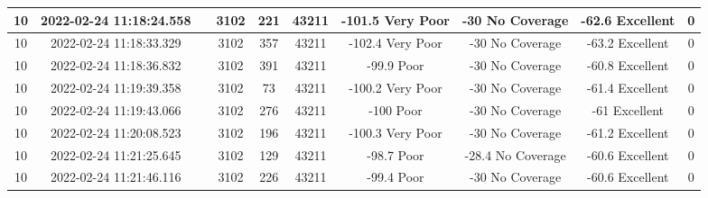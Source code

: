 \begin{longtable*}{|c|c|c|c|c|c|c|c|c|c|}
10&2022-02-24 11:18:24.558&&3102&221&43211& -101.5    Very Poor   & -30       No Coverage & -62.6     Excellent   & 0\\\hline
{}10&2022-02-24 11:18:33.329&&3102&357&43211& -102.4    Very Poor   & -30       No Coverage & -63.2     Excellent   & 0\\\hline
{}10&2022-02-24 11:18:36.832&&3102&391&43211& -99.9     Poor        & -30       No Coverage & -60.8     Excellent   & 0\\\hline
{}10&2022-02-24 11:19:39.358&&3102&73&43211& -100.2    Very Poor   & -30       No Coverage & -61.4     Excellent   & 0\\\hline
{}10&2022-02-24 11:19:43.066&&3102&276&43211& -100      Poor        & -30       No Coverage & -61       Excellent   & 0\\\hline
{}10&2022-02-24 11:20:08.523&&3102&196&43211& -100.3    Very Poor   & -30       No Coverage & -61.2     Excellent   & 0\\\hline
{}10&2022-02-24 11:21:25.645&&3102&129&43211& -98.7     Poor        & -28.4     No Coverage & -60.6     Excellent   & 0\\\hline
{}10&2022-02-24 11:21:46.116&&3102&226&43211& -99.4     Poor        & -30       No Coverage & -60.6     Excellent   & 0\\\hline

\end{longtable*}
